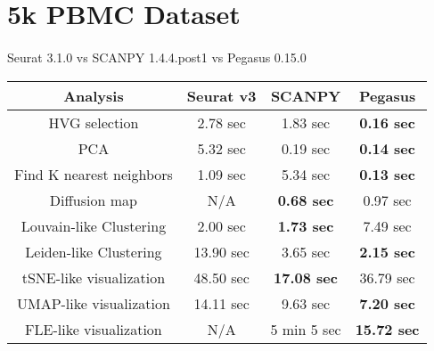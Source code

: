 \documentclass[10pt]{article}
\begin{document}
\section{5k PBMC Dataset}

\paragraph{}
Seurat 3.1.0 \qquad vs \qquad SCANPY 1.4.4.post1 \qquad vs \qquad Pegasus 0.15.0

\begin{table}[H]
	\centering
	\begin{tabular}{|c|c|c|c|}
		\hline
		Analysis & Seurat v3 & SCANPY & Pegasus\\
		\hline \hline
		HVG selection & 2.78 sec & 1.83 sec  & \textbf{0.16 sec}  \\
		\hline
		PCA & 5.32 sec & 0.19 sec & \textbf{0.14 sec}  \\
		\hline
		Find K nearest neighbors & 1.09 sec  & 5.34 sec & \textbf{0.13 sec} \\
		\hline
		Diffusion map & N/A & \textbf{0.68 sec} & 0.97 sec  \\
		\hline
		Louvain-like Clustering & 2.00 sec & \textbf{1.73 sec} & 7.49 sec \\
		\hline 
		Leiden-like Clustering & 13.90 sec & 3.65 sec & \textbf{2.15 sec} \\
		\hline
		tSNE-like visualization & 48.50 sec & \textbf{17.08 sec} & 36.79 sec  \\
		\hline
		UMAP-like visualization & 14.11 sec & 9.63 sec & \textbf{7.20 sec} \\
		\hline
		FLE-like visualization & N/A & 5 min 5 sec & \textbf{15.72 sec} \\
		\hline
	\end{tabular}
\end{table}
\end{document}

